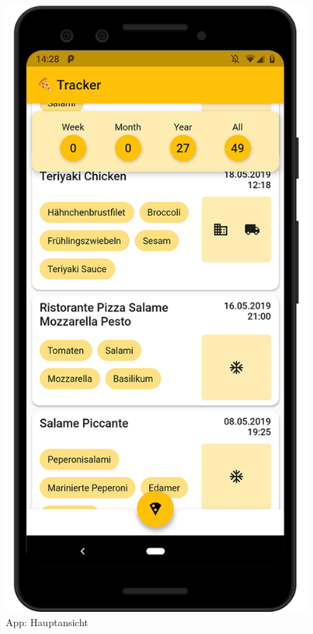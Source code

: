 \begin{figure}[H]
    \vspace{0pt}
        \includegraphics[width=\linewidth]{pixel-3_mockup-1}
        \caption{
            App: Hauptansicht
}
\end{figure}
